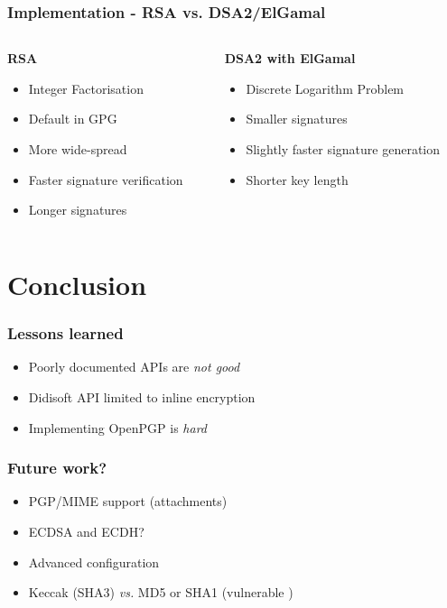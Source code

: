 \documentclass{beamer}
\begin{document}
\begin{frame}
\frametitle{Implementation - RSA vs. DSA2/ElGamal}
\begin{columns}[onlytextwidth]
\begin{column}{0.45\textwidth} %
\centering
\textbf{RSA}
\begin{itemize}
\item Integer Factorisation
\item Default in GPG \cite{wk}
\item More wide-spread
\item Faster signature verification
\item Longer signatures
\end{itemize}
\end{column}

\begin{column}{0.45\textwidth} %
\centering
\textbf{DSA2 with ElGamal}
\begin{itemize}
\item Discrete Logarithm Problem
\item Smaller signatures
\item Slightly faster signature generation
\item Shorter key length
\end{itemize}
\end{column}
\end{columns}
\end{frame}

\section{Conclusion}
\begin{frame}
\frametitle{Lessons learned}
\begin{itemize}
\item Poorly documented APIs are \emph{not good}
\item Didisoft API limited to inline encryption \cite{dd}
\item Implementing OpenPGP is \emph{hard}
\end{itemize}
\end{frame}


\begin{frame}[fragile] %
\frametitle{Future work?}
\begin{itemize}
\item PGP/MIME support (attachments)
\item ECDSA and ECDH?
\item Advanced configuration 
\item Keccak (SHA3) \emph{vs.} MD5 or SHA1 (vulnerable \cite{sh})
\end{itemize}
\end{frame}
\end{document}
